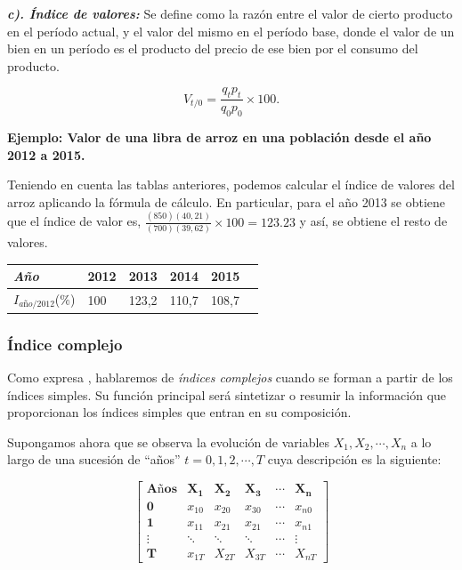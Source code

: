 \documentclass[
]{book}
\begin{document}
\textbf{\emph{c). Índice de valores:}} Se define como la razón entre el valor de cierto producto en el período actual, y el valor del mismo en el período base, donde el valor de un bien en un período es el producto del precio de ese bien por el consumo del producto.

\[\begin{equation}
V_{t/0}=\frac{q_{t}p_{t}}{q_{0}p_{0}}\times 100.
\end{equation}\]

\textbf{Ejemplo: Valor de una libra de arroz en una población desde el año 2012 a 2015.}

Teniendo en cuenta las tablas anteriores, podemos calcular el índice de valores del arroz aplicando la fórmula de cálculo. En particular, para el año 2013 se obtiene que el índice de valor es,
\(\frac{(850)(40,21)}{(700)(39,62)}\times 100=123.23\)
y así, se obtiene el resto de valores.

\begin{longtable}[]{@{}llllll@{}}
\toprule
\emph{Año} & 2012 & 2013 & 2014 & 2015 &\tabularnewline
\midrule
\endhead
\(I_{año/2012}\)(\(\%\)) & 100 & 123,2 & 110,7 & 108,7 &\tabularnewline
\bottomrule
\end{longtable}

\hypertarget{indicecomplejo}{%
\subsubsection{Índice complejo}\label{indicecomplejo}}

Como expresa \citet{lorenzo2007estadistica}, hablaremos de \emph{índices complejos} cuando se forman a partir de los índices simples. Su función principal será sintetizar o resumir la información que proporcionan los índices simples que entran en su composición.

Supongamos ahora que se observa la evolución de variables \(X_1,X_2,\cdots, X_n\) a lo largo de una sucesión de ``años'' \(t=0,1,2,\cdots,T\) cuya descripción es la siguiente:

\[
\begin{equation}
\begin{bmatrix}
  \textbf{Años} & \mathbf{X_1} & \mathbf{X_2} & \mathbf{X_3} &\cdots & \mathbf{X_n}\\
     \mathbf{0}& x_{10} & x_{20} & x_{30} & \cdots & x_{n0}\\
    \mathbf{1} & x_{11} & x_{21} & x_{21} & \cdots & x_{n1}\\
     \vdots & \ddots & \ddots & \ddots & \cdots & \vdots\\
     \mathbf{T} & x_{1T} & X_{2T} & X_{3T} & \cdots & X_{nT}
    \end{bmatrix}
\end{equation}
\]
\end{document}
